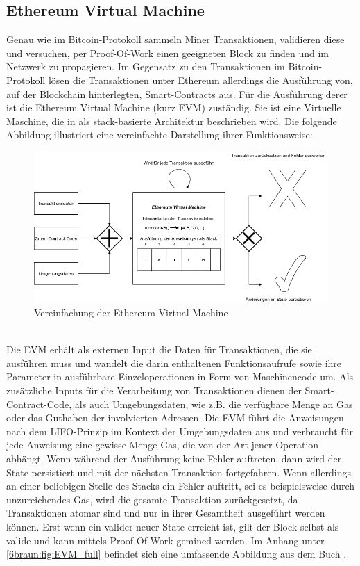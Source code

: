\subsection{Ethereum Virtual Machine}
Genau wie im Bitcoin-Protokoll sammeln Miner Transaktionen, validieren diese und versuchen, per Proof-Of-Work einen geeigneten Block zu finden und im Netzwerk zu propagieren. 
Im Gegensatz zu den Transaktionen im Bitcoin-Protokoll lösen die Transaktionen unter Ethereum allerdings die Ausführung von, auf der Blockchain hinterlegten, Smart-Contracts aus. 
Für die Ausführung derer ist die Ethereum Virtual Machine (kurz EVM) zuständig. 
Sie ist eine Virtuelle Maschine, die in  \cite{wood_yellowpaper_2014} als stack-basierte Architektur beschrieben wird. 
Die folgende Abbildung illustriert eine vereinfachte Darstellung ihrer Funktionsweise: 
\begin{figure}[htpb]
	\centering
	\includegraphics[width=\textwidth]{images/evm_simple.png}
	\caption{Vereinfachung der Ethereum Virtual Machine}
	\label{6braun:fig:evm_simple}
\end{figure}\\
Die EVM erhält als externen Input die Daten für Transaktionen, die sie ausführen muss und wandelt die darin enthaltenen Funktionsaufrufe sowie ihre Parameter in ausführbare Einzeloperationen in Form von Maschinencode um. 
Als zusätzliche Inputs für die Verarbeitung von Transaktionen dienen der Smart-Contract-Code, als auch Umgebungsdaten, wie z.B. die verfügbare Menge an Gas oder das Guthaben der involvierten Adressen. 
Die EVM führt die Anweisungen nach dem LIFO-Prinzip im Kontext der Umgebungsdaten aus und verbraucht für jede Anweisung eine gewisse Menge Gas, die von der Art jener Operation abhängt. Wenn während der Ausführung keine Fehler auftreten, dann wird der State persistiert und mit der nächsten Transaktion fortgefahren. 
Wenn allerdings an einer beliebigen Stelle des Stacks ein Fehler auftritt, sei es beispielsweise durch unzureichendes Gas, wird die gesamte Transaktion zurückgesetzt, da Transaktionen atomar sind und nur in ihrer Gesamtheit ausgeführt werden können. Erst wenn ein valider neuer State erreicht ist, gilt der Block selbst als valide und kann mittels Proof-Of-Work gemined werden. Im Anhang unter \ref{6braun:fig:EVM_full} befindet sich eine umfassende Abbildung aus dem Buch \cite{antanopoulos_2018}.
